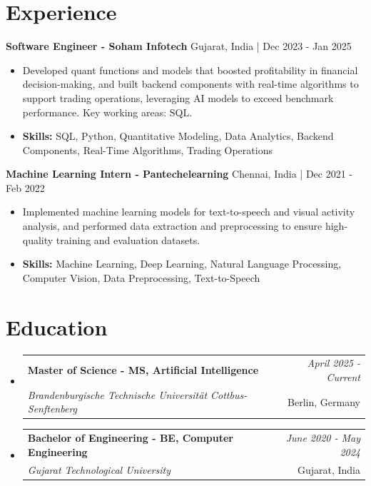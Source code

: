 \documentclass[a4paper,11pt]{article}
\makeatletter
\newcommand{\resumeSubheading}[4]{
\vspace{0.5mm}\item
    \begin{tabular*}{\linewidth}[t]{l@{\extracolsep{\fill}}r}
        \textbf{#1} & \textit{\footnotesize{#4}} \\
        \textit{\footnotesize{#3}} &  \footnotesize{#2}\\
    \end{tabular*}
    \vspace{-2.4mm}
}
\makeatother
\begin{document}
\section{\textbf{Experience}}


\vspace{1mm}
  \textbf{Software Engineer - Soham Infotech} \hfill Gujarat, India | Dec 2023 - Jan 2025
\vspace{-1.5mm} %
\begin{itemize}
  \item Developed quant functions and models that boosted profitability in financial decision-making, and built backend components with real-time algorithms to support trading operations, leveraging AI models to exceed benchmark performance. Key working areas: SQL.

\vspace{-2mm}
  \item \textbf{Skills:} SQL, Python, Quantitative Modeling, Data Analytics, Backend Components, Real-Time Algorithms, Trading Operations
\end{itemize}

\vspace{1mm}
  \textbf{Machine Learning Intern - Pantechelearning} \hfill Chennai, India | Dec 2021 - Feb 2022
\vspace{-1.5mm} %
\begin{itemize}
  \item Implemented machine learning models for text-to-speech and visual activity analysis, and performed data extraction and preprocessing to ensure high-quality training and evaluation datasets.
\vspace{-2mm}
  \item \textbf{Skills:} Machine Learning, Deep Learning, Natural Language Processing, Computer Vision, Data Preprocessing, Text-to-Speech
\end{itemize}\section{\textbf{Education}}
\vspace{-0.4mm}

\begin{itemize}[leftmargin=0.15in, label={}]
\resumeSubheading
{Master of Science - MS, Artificial Intelligence }{Berlin, Germany}
{Brandenburgische Technische Universität Cottbus-Senftenberg  }{April 2025 - Current}

\vspace{1.0mm} %
\resumeSubheading
{Bachelor of Engineering - BE, Computer Engineering  }{Gujarat, India}
{Gujarat Technological University }{June 2020 - May 2024}

\end{itemize}
\end{document}
